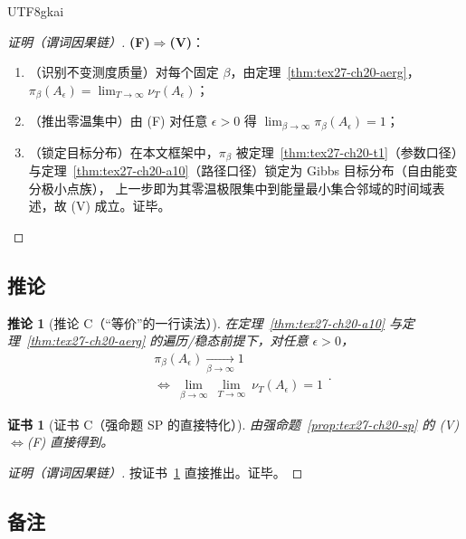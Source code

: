 \documentclass[12pt]{article}
\newtheorem{corollary}{推论}[section]
\newtheorem{Certificate}{证书}[section]
\begin{document}
\begin{CJK*}{UTF8}{gkai}
\begin{proof}[证明（谓词因果链）]
\textbf{(F)$\Rightarrow$(V)}：
\begin{enumerate}
  \item（识别不变测度质量）对每个固定 $\beta$，由定理~\ref{thm:tex27-ch20-aerg}，
  $\pi_\beta(A_\epsilon)=\lim_{T\to\infty}\nu_T(A_\epsilon)$；
  \item（推出零温集中）由 (F) 对任意 $\epsilon>0$ 得 $\lim_{\beta\to\infty}\pi_\beta(A_\epsilon)=1$；
  \item（锁定目标分布）在本文框架中，$\pi_\beta$ 被定理~\ref{thm:tex27-ch20-t1}（参数口径）与定理~\ref{thm:tex27-ch20-a10}（路径口径）锁定为 Gibbs
    目标分布（自由能变分极小点族），
  上一步即为其零温极限集中到能量最小集合邻域的时间域表述，故 (V) 成立。证毕。
\end{enumerate}
\end{proof}

\subsection{推论}
\label{subsec:tex27-ch20-corollary}

\begin{corollary}[推论 C（“等价”的一行读法）]
\label{cor:tex27-ch20-c}
在定理~\ref{thm:tex27-ch20-a10} 与定理~\ref{thm:tex27-ch20-aerg} 的遍历/稳态前提下，对任意 $\epsilon>0$，
\[
  \boxed{\begin{aligned}
    &\pi_\beta(A_\epsilon)\xrightarrow[\beta\to\infty]{}1\\
    &\Longleftrightarrow\ \lim_{\beta\to\infty}\ \lim_{T\to\infty}\ \nu_T(A_\epsilon)=1
  \end{aligned}}.
\]
\end{corollary}

\begin{Certificate}[证书 C（强命题 SP 的直接特化）]
\label{cert:tex27-ch20-c}
由强命题~\ref{prop:tex27-ch20-sp} 的 (V)$\Leftrightarrow$(F) 直接得到。
\end{Certificate}

\begin{proof}[证明（谓词因果链）]
按证书~\ref{cert:tex27-ch20-c} 直接推出。证毕。
\end{proof}

\subsection{备注}
\label{subsec:tex27-ch20-remarks}


\end{CJK*}
\end{document}
